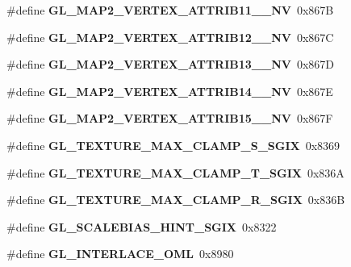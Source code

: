 \begin{DoxyCompactItemize}
\item 
\#define {\bfseries G\+L\+\_\+\+M\+A\+P2\+\_\+\+V\+E\+R\+T\+E\+X\+\_\+\+A\+T\+T\+R\+I\+B11\+\_\+\_\+\+N\+V}~0x867\+B\label{_s_d_l__opengl_8h_a215ee8ba8a95a4895c75d5dd0be1eb28}

\item 
\#define {\bfseries G\+L\+\_\+\+M\+A\+P2\+\_\+\+V\+E\+R\+T\+E\+X\+\_\+\+A\+T\+T\+R\+I\+B12\+\_\+\_\+\+N\+V}~0x867\+C\label{_s_d_l__opengl_8h_acabe05412382f2200c02030630626e64}

\item 
\#define {\bfseries G\+L\+\_\+\+M\+A\+P2\+\_\+\+V\+E\+R\+T\+E\+X\+\_\+\+A\+T\+T\+R\+I\+B13\+\_\+\_\+\+N\+V}~0x867\+D\label{_s_d_l__opengl_8h_a856d8fd551e839c47e9cc8b05f3658c4}

\item 
\#define {\bfseries G\+L\+\_\+\+M\+A\+P2\+\_\+\+V\+E\+R\+T\+E\+X\+\_\+\+A\+T\+T\+R\+I\+B14\+\_\+\_\+\+N\+V}~0x867\+E\label{_s_d_l__opengl_8h_a8abdb8292534cf5f9d3fe652e9bb8feb}

\item 
\#define {\bfseries G\+L\+\_\+\+M\+A\+P2\+\_\+\+V\+E\+R\+T\+E\+X\+\_\+\+A\+T\+T\+R\+I\+B15\+\_\+\_\+\+N\+V}~0x867\+F\label{_s_d_l__opengl_8h_a69099070a7a15f973823a91845d553cd}

\item 
\#define {\bfseries G\+L\+\_\+\+T\+E\+X\+T\+U\+R\+E\+\_\+\+M\+A\+X\+\_\+\+C\+L\+A\+M\+P\+\_\+\+S\+\_\+\+S\+G\+I\+X}~0x8369\label{_s_d_l__opengl_8h_a28098e27870228808b5730ce9805c0b1}

\item 
\#define {\bfseries G\+L\+\_\+\+T\+E\+X\+T\+U\+R\+E\+\_\+\+M\+A\+X\+\_\+\+C\+L\+A\+M\+P\+\_\+\+T\+\_\+\+S\+G\+I\+X}~0x836\+A\label{_s_d_l__opengl_8h_a22d3f36bbae9c29cfd9df4f445fa24f9}

\item 
\#define {\bfseries G\+L\+\_\+\+T\+E\+X\+T\+U\+R\+E\+\_\+\+M\+A\+X\+\_\+\+C\+L\+A\+M\+P\+\_\+\+R\+\_\+\+S\+G\+I\+X}~0x836\+B\label{_s_d_l__opengl_8h_a7e454185cc01edcf116f7c2949e3eb79}

\item 
\#define {\bfseries G\+L\+\_\+\+S\+C\+A\+L\+E\+B\+I\+A\+S\+\_\+\+H\+I\+N\+T\+\_\+\+S\+G\+I\+X}~0x8322\label{_s_d_l__opengl_8h_ad3df9a770011fa0fbb635f0ab2602cf6}

\item 
\#define {\bfseries G\+L\+\_\+\+I\+N\+T\+E\+R\+L\+A\+C\+E\+\_\+\+O\+M\+L}~0x8980\label{_s_d_l__opengl_8h_a745522ff805e2f98e24950858d496666}


\end{DoxyCompactItemize}
